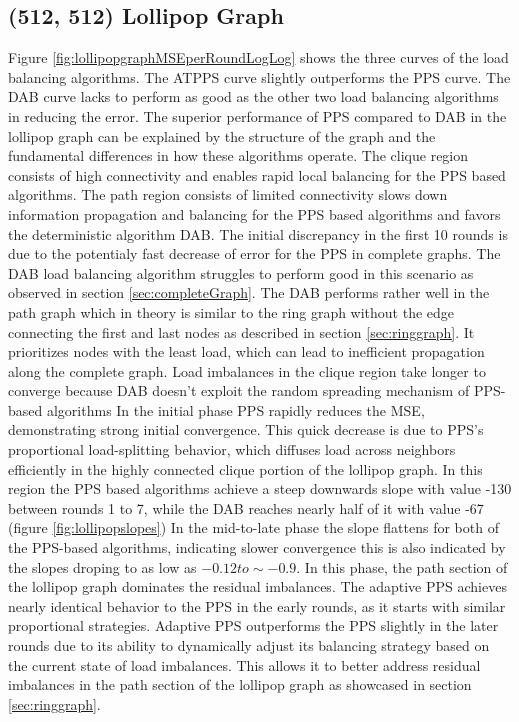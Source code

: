 \subsection{(512, 512) Lollipop Graph}
Figure \ref{fig:lollipopgraphMSEperRoundLogLog} shows the three curves of the load balancing algorithms. The ATPPS curve slightly outperforms the PPS curve. The DAB curve lacks to perform as good as the other two load balancing algorithms in reducing the error. The superior performance of PPS compared to DAB in the lollipop graph can be explained by the structure of the graph and the fundamental differences in how these algorithms operate. The clique region consists of high connectivity and enables rapid local balancing for the PPS based algorithms. The path region consists of limited connectivity slows down information propagation and balancing for the PPS based algorithms and favors the deterministic algorithm DAB. The initial discrepancy in the first 10 rounds is due to the potentialy fast decrease of error for the PPS in complete graphs. The DAB load balancing algorithm struggles to perform good in this scenario as observed in section \ref{sec:completeGraph}. The DAB performs rather well in the path graph which in theory is similar to the ring graph without the edge connecting the first and last nodes as described in section \ref{sec:ringgraph}. It prioritizes nodes with the least load, which can lead to inefficient propagation along the complete graph. Load imbalances in the clique region take longer to converge because DAB doesn't exploit the random spreading mechanism of PPS-based algorithms In the initial phase PPS rapidly reduces the MSE, demonstrating strong initial convergence. This quick decrease is due to PPS's proportional load-splitting behavior, which diffuses load across neighbors efficiently in the highly connected clique portion of the lollipop graph. In this region the PPS based algorithms achieve a steep downwards slope with value -130 between rounds 1 to 7, while the DAB reaches nearly half of it with value -67 (figure \ref{fig:lollipopslopes}) In the mid-to-late phase the slope flattens for both of the PPS-based algorithms, indicating slower convergence this is also indicated by the slopes droping to as low as $-0.12 to \sim-0.9$. In this phase, the path section of the lollipop graph dominates the residual imbalances. The adaptive PPS achieves nearly identical behavior to the PPS in the early rounds, as it starts with similar proportional strategies. Adaptive PPS outperforms the PPS slightly in the later rounds due to its ability to dynamically adjust its balancing strategy based on the current state of load imbalances. This allows it to better address residual imbalances in the path section of the lollipop graph as showcased in section \ref{sec:ringgraph}.

